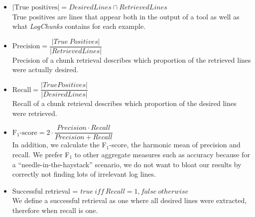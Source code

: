 \vspace{0.2cm}
\begin{itemize}[leftmargin=0.4cm] \itemsep1em
	\item $|\mbox{True positives}| = \mathit{DesiredLines} \cap
	\mathit{RetrievedLines}$ \vspace{0.2cm}\\
	True positives are lines that appear both in the output of a
	tool as well as what \textit{LogChunks} contains for each
	example.

	\item $\mbox{Precision} = \dfrac{|\mathit{True\
	Positives}|}{|\mathit{RetrievedLines}|}$ \vspace{0.21cm} \\
	Precision of a chunk retrieval describes which proportion of
	the retrieved lines were actually desired.

	\item $\mbox{Recall} =
	\dfrac{|\mathit{TruePositives}|}{|\mathit{DesiredLines}|}$
	\vspace{0.2cm} \\
	Recall of a chunk retrieval describes which proportion of the
	desired lines were retrieved.
	\item $\mbox{F$_{1}$-score} = 2 \cdot \dfrac{\mathit{Precision}
	\cdot \mathit{Recall}}{\mathit{Precision} + \mathit{Recall}}$
	\vspace{0.2cm}\\
	In addition, we calculate the F$_{1}$-score, the harmonic mean
	of precision and recall.
We prefer F$_{1}$ to other aggregate
	measures such as accuracy because for a
	``needle-in-the-haystack'' scenario, we do not want to bloat
	our results by correctly not finding lots of irrelevant log
	lines.
	\item Successful retrieval = $\mathit{true}\ \mathit{iff}\
	\mathit{Recall} = 1, \mathit{false\ otherwise}$  \vspace{0.2cm} \\
	We define a successful retrieval as one where all desired
	lines were
	extracted, therefore when recall is one.
\end{itemize}


